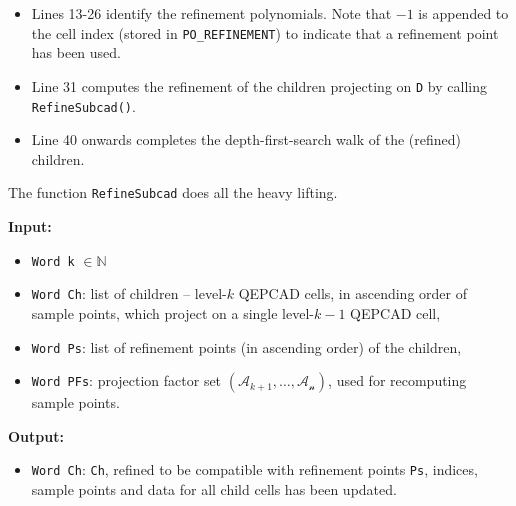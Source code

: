 \documentclass[
]{book}
\providecommand{\tightlist}{%
  \setlength{\itemsep}{0pt}\setlength{\parskip}{0pt}}
\theoremstyle{definition}
\theoremstyle{definition}
\theoremstyle{definition}
\theoremstyle{definition}
\theoremstyle{remark}
\begin{document}
\begin{itemize}
\tightlist
\item
  Lines 13-26 identify the refinement polynomials. Note that \(-1\) is appended to the cell index (stored in \texttt{PO\_REFINEMENT}) to indicate that a refinement point has been used.
\item
  Line 31 computes the refinement of the children projecting on \texttt{D} by calling \texttt{RefineSubcad()}.
\item
  Line 40 onwards completes the depth-first-search walk of the (refined) children.
\end{itemize}

The function \texttt{RefineSubcad} does all the heavy lifting.

\textbf{Input:}

\begin{itemize}
\tightlist
\item
  \texttt{Word\ k} \(\in \mathbb{N}\)
\item
  \texttt{Word\ Ch}: list of children -- level-\(k\) QEPCAD cells, in ascending order of sample points, which project on a single level-\(k-1\) QEPCAD cell,
\item
  \texttt{Word\ Ps}: list of refinement points (in ascending order) of the children,
\item
  \texttt{Word\ PFs}: projection factor set \((\mathcal{A}_{k+1},\ldots,\mathcal{A_n})\), used for recomputing sample points.
\end{itemize}

\textbf{Output:}

\begin{itemize}
\tightlist
\item
  \texttt{Word\ Ch\textquotesingle{}}: \texttt{Ch}, refined to be compatible with refinement points \texttt{Ps}, indices, sample points and data for all child cells has been updated.
\end{itemize}
\end{document}
